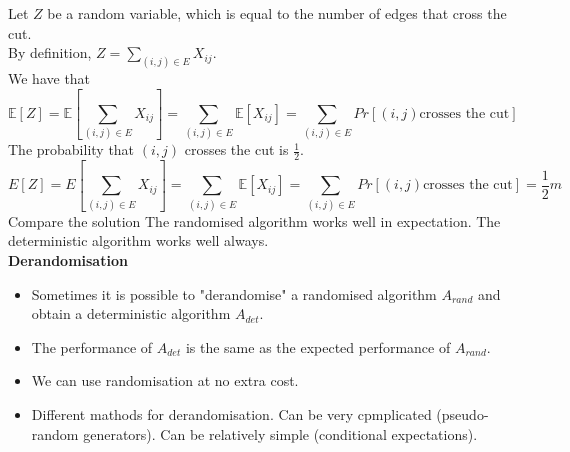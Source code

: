 \documentclass[onecolumn]{report}
\begin{document}
Let $Z$ be a random variable, which is equal to the number of edges that cross the cut.\\
By definition, $Z = \sum_{(i,j) \in E} X_{ij}$.\\
We have that
\begin{equation*}
    \mathbb{E}[Z] = \mathbb{E}[\sum_{(i,j) \in E} X_{ij}] = \sum_{(i,j) \in E} \mathbb{E}[X_{ij}] = \sum_{(i,j) \in E} Pr[(i,j) \text{crosses the cut}]
\end{equation*}
The probability that $(i,j)$ crosses the cut is $\frac{1}{2}$.\\
\begin{equation*}
    E[Z] = E[\sum_{(i,j) \in E} X_{ij}] = \sum_{(i,j) \in E} \mathbb{E}[X_{ij}] = \sum_{(i,j) \in E} Pr[(i,j) \text{crosses the cut}] = \frac{1}{2}m
\end{equation*}
Compare the solution
The randomised algorithm works well in expectation. The deterministic algorithm works well always.\\
\textbf{Derandomisation}
\begin{itemize}
    \item Sometimes it is possible to "derandomise" a randomised algorithm $A_{rand}$ and obtain a deterministic algorithm $A_{det}$.
    \item The performance of $A_{det}$ is the same as the expected performance of $A_{rand}$.
    \item We can use randomisation at no extra cost.
    \item Different mathods for derandomisation.
    \subitem Can be very cpmplicated (pseudo-random generators).
    \subitem Can be relatively simple (conditional expectations).
\end{itemize}
\end{document}
